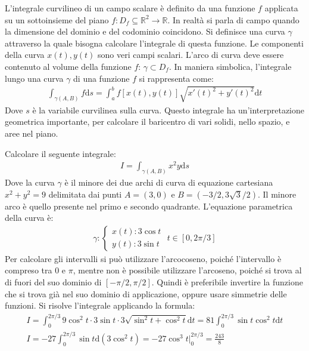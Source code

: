 \documentclass{article}
\newcommand{\df}{\mathrm{d}}
\numberwithin{equation}{subsection}
\begin{document}
L'integrale curvilineo di un campo scalare è definito da una funzione $f$ applicata su un sottoinsieme del piano $f:D_f\subseteq\mathbb{R}^2\to\mathbb{R}$. In realtà si parla di campo quando la dimensione del dominio e del codominio coincidono. 
Si definisce una curva $\gamma$ attraverso la quale bisogna calcolare l'integrale di questa funzione. Le componenti della curva $x(t),y(t)$ sono veri campi scalari. 
L'arco di curva deve essere contenuto al volume della funzione $f$: $\gamma\subset D_f$. 
In maniera simbolica, l'integrale lungo una curva $\gamma$ di una funzione $f$ si rappresenta come:
\begin{gather*}
    \int_{\gamma(A,B)}f \df s=\int_a^bf[x(t),y(t)]\sqrt{x'(t)^2+y'(t)^2}\df t
\end{gather*}
Dove $s$ è la variabile curvilinea sulla curva. Questo integrale ha un'interpretazione geometrica importante, per calcolare il baricentro di vari solidi, nello spazio, e aree nel piano. 


Calcolare il seguente integrale:
\begin{gather*}
    I=\int_{\gamma(A,B)}x^2y\df s
\end{gather*}
Dove la curva $\gamma$ è il minore dei due archi di curva di equazione cartesiana $x^2+y^2=9$ delimitata dai punti $A=(3,0)$ e $B=(-3/2,3\sqrt{3}/2)$. 
Il minore arco è quello presente nel primo e secondo quadrante. L'equazione parametrica della curva è:
\begin{gather*}
    \gamma:\begin{cases}
        x(t):3\cos t\\
        y(t):3\sin t
    \end{cases}\,\, t\in[0,2\pi/3]
\end{gather*}
Per calcolare gli intervalli si può utilizzare l'arcocoseno, poiché l'intervallo è compreso tra $0$ e $\pi$, mentre non è possibile utilizzare l'arcoseno, poiché si trova al di fuori del suo dominio di $[-\pi/2,\pi/2]$. Quindi è preferibile invertire la funzione che si trova già nel suo dominio di applicazione, oppure usare simmetrie delle funzioni. 
Si risolve l'integrale applicando la formula:
\begin{gather*}
    I=\int_0^{2\pi/3}9\cos^2 t\cdot3\sin t\cdot3\sqrt{\sin^2t+\cos^2t}\df t=
    81\int_0^{2\pi/3}\sin t\cos^2t\df t\\
    I=-27\int_0^{2\pi/3}\sin t\df(3\cos^2t)=-27\cos^3t\bigg|_0^{2\pi/3}=\frac{243}{8}
\end{gather*}
\end{document}

